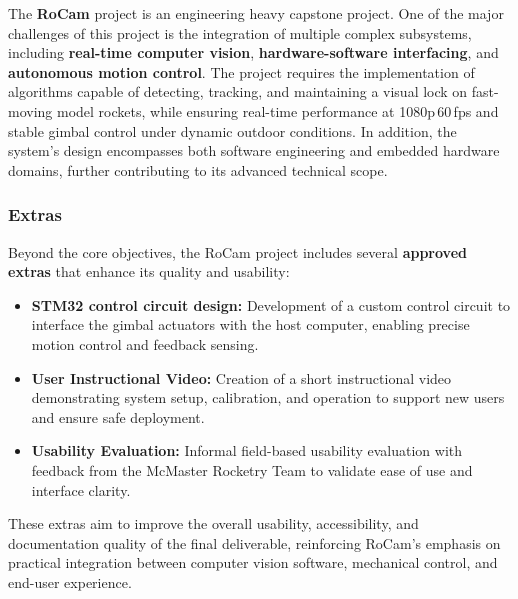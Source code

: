 \documentclass[12pt, titlepage]{article}
\begin{document}
The \textbf{RoCam} project is an engineering heavy capstone project. One of the
major challenges of this project is the integration of multiple complex
subsystems, including \textbf{real-time computer vision},
\textbf{hardware-software interfacing}, and \textbf{autonomous motion control}.
The project requires the implementation of algorithms capable of detecting,
tracking, and maintaining a visual lock on fast-moving model rockets, while
ensuring real-time performance at 1080p\,60\,fps and stable gimbal control
under dynamic outdoor conditions. In addition, the system's design encompasses
both software engineering and embedded hardware domains, further contributing
to its advanced technical scope.

\subsubsection*{Extras}
Beyond the core objectives, the RoCam project includes several
\textbf{approved extras} that enhance its quality and usability:
\begin{itemize}
  \item \textbf{STM32 control circuit design:} Development of a
        custom control circuit to interface the gimbal actuators with
        the host computer, enabling precise motion control and feedback sensing.
  \item \textbf{User Instructional Video:} Creation of a short instructional
        video demonstrating system setup, calibration, and operation to support
        new users and ensure safe deployment.
  \item \textbf{Usability Evaluation:} Informal field-based usability
        evaluation with feedback from the McMaster Rocketry Team to validate
        ease of use and interface clarity.
\end{itemize}

These extras aim to improve the overall usability, accessibility, and
documentation quality of the final deliverable, reinforcing RoCam's emphasis on
practical integration between computer vision software, mechanical control, and
end-user experience.

\end{document}
